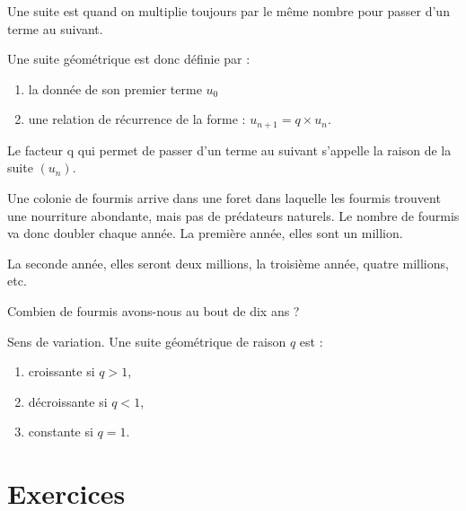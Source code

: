 
\begin{definition}\cite{IYfYrIl}
    Une suite est  quand on multiplie toujours par le même nombre pour passer d'un terme au suivant.

Une suite géométrique est donc définie par :
\begin{enumerate}
    \item
la donnée de son premier terme $u_0$
\item
une relation de récurrence de la forme : $u_{n+1} = q\times u_n$.
\end{enumerate}
Le facteur q qui permet de passer d'un terme au suivant s'appelle la raison de la suite $(u_n)$.
\end{definition}

\begin{example}
    Une colonie de fourmis arrive dans une foret dans laquelle les fourmis trouvent une nourriture abondante, mais pas de prédateurs naturels. Le nombre de fourmis va donc doubler chaque année. La première année, elles sont un million.

    La seconde année, elles seront deux millions, la troisième année, quatre millions, etc.

    Combien de fourmis avons-nous au bout de dix ans ?

\end{example}

\begin{Aretenir}
    Sens de variation. Une suite géométrique de raison \( q\) est :
    \begin{enumerate}
        \item
            croissante si \( q>1\),
        \item
            décroissante si \( q<1\),
        \item
            constante si \( q=1\).
    \end{enumerate}
\end{Aretenir}

\section{Exercices}

